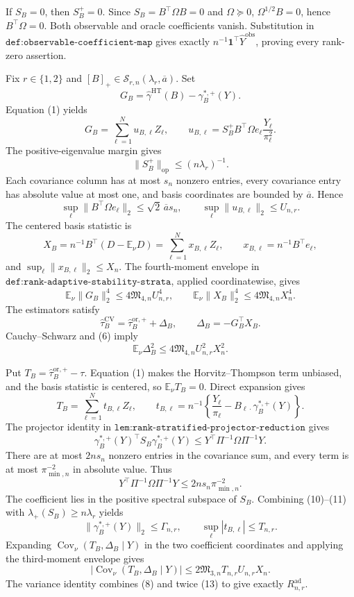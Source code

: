 If \(S_B=0\), then \(S_B^+=0\).  Since \(S_B=B^{\top}\Omega B=0\) and \(\Omega\succeq0\), \(\Omega^{1/2}B=0\), hence \(B^{\top}\Omega=0\).  Both observable and oracle coefficients vanish.  Substitution in \(\texttt{def:observable-coefficient-map}\) gives exactly \(n^{-1}\mathbf1^{\top}\widehat Y^{\mathrm{obs}}\), proving every rank-zero assertion.

Fix \(r\in\{1,2\}\) and \([B]_+\in\mathcal S_{r,n}(\lambda_r,\overline a)\).  Set
\[
G_B=\widehat\gamma^{\mathrm{HT}}(B)-\gamma_B^{*,+}(Y).
\]
Equation (1) yields
\[
G_B=\sum_{\ell=1}^{N}u_{B,\ell}Z_\ell,
\qquad
u_{B,\ell}=S_B^+B^{\top}\Omega e_\ell\frac{Y_\ell}{\pi_\ell^2}.
\tag{2}
\]
The positive-eigenvalue margin gives
\[
\lVert S_B^+\rVert_{\mathrm{op}}\le(n\lambda_r)^{-1}.
\tag{3}
\]
Each covariance column has at most \(s_n\) nonzero entries, every covariance entry has absolute value at most one, and basis coordinates are bounded by \(\overline a\).  Hence
\[
\sup_\ell\lVert B^{\top}\Omega e_\ell\rVert_2
\le\sqrt2\,\overline a s_n,
\qquad
\sup_\ell\lVert u_{B,\ell}\rVert_2\le U_{n,r}.
\tag{4}
\]
The centered basis statistic is
\[
X_B=n^{-1}B^{\top}(D-\mathbb E_\nu D)
=\sum_{\ell=1}^{N}x_{B,\ell}Z_\ell,
\qquad x_{B,\ell}=n^{-1}B^{\top}e_\ell,
\tag{5}
\]
and \(\sup_\ell\lVert x_{B,\ell}\rVert_2\le X_n\).  The fourth-moment envelope in \(\texttt{def:rank-adaptive-stability-strata}\), applied coordinatewise, gives
\[
\mathbb E_\nu\lVert G_B\rVert_2^4
\le4\mathfrak M_{4,n}U_{n,r}^4,
\qquad
\mathbb E_\nu\lVert X_B\rVert_2^4
\le4\mathfrak M_{4,n}X_n^4.
\tag{6}
\]
The estimators satisfy
\[
\widehat\tau_B^{\mathrm{CV}}
=\widehat\tau_B^{\mathrm{or},+}+\Delta_B,
\qquad \Delta_B=-G_B^{\top}X_B.
\tag{7}
\]
Cauchy--Schwarz and (6) imply
\[
\mathbb E_\nu\Delta_B^2
\le4\mathfrak M_{4,n}U_{n,r}^2X_n^2.
\tag{8}
\]

Put \(T_B=\widehat\tau_B^{\mathrm{or},+}-\tau\).  Equation (1) makes the Horvitz--Thompson term unbiased, and the basis statistic is centered, so \(\mathbb E_\nu T_B=0\).  Direct expansion gives
\[
T_B=\sum_{\ell=1}^{N}t_{B,\ell}Z_\ell,
\qquad
t_{B,\ell}=n^{-1}\left\{\frac{Y_\ell}{\pi_\ell}
-B_{\ell\cdot}\gamma_B^{*,+}(Y)\right\}.
\tag{9}
\]
The projector identity in \(\texttt{lem:rank-stratified-projector-reduction}\) gives
\[
\gamma_B^{*,+}(Y)^{\top}S_B\gamma_B^{*,+}(Y)
\le Y^{\top}\Pi^{-1}\Omega\Pi^{-1}Y.
\tag{10}
\]
There are at most \(2ns_n\) nonzero entries in the covariance sum, and every term is at most \(\pi_{\min,n}^{-2}\) in absolute value.  Thus
\[
Y^{\top}\Pi^{-1}\Omega\Pi^{-1}Y
\le2ns_n\pi_{\min,n}^{-2}.
\tag{11}
\]
The coefficient lies in the positive spectral subspace of \(S_B\).  Combining (10)--(11) with \(\lambda_+(S_B)\ge n\lambda_r\) yields
\[
\lVert\gamma_B^{*,+}(Y)\rVert_2\le\Gamma_{n,r},
\qquad
\sup_\ell|t_{B,\ell}|\le T_{n,r}.
\tag{12}
\]
Expanding \(\operatorname{Cov}_\nu(T_B,\Delta_B\mid Y)\) in the two coefficient coordinates and applying the third-moment envelope gives
\[
|\operatorname{Cov}_\nu(T_B,\Delta_B\mid Y)|
\le2\mathfrak M_{3,n}T_{n,r}U_{n,r}X_n.
\tag{13}
\]
The variance identity combines (8) and twice (13) to give exactly \(R_{n,r}^{\mathrm{ad}}\).

